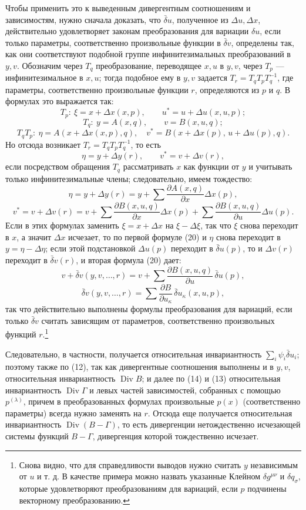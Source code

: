 \documentclass[11pt]{article}
\providecommand{\D}{\Delta}
\providecommand{\p}{\partial}
\DeclareMathOperator{\Div}{Div}
\providecommand{\bd}{\bar{\delta}}
\begin{document}
Чтобы применить это к выведенным дивергентным соотношениям и зависимостям, нужно сначала доказать, что \(\bd u\), полученное из \(\D u,\D x\), действительно удовлетворяет законам преобразования для вариации \(\delta u\), если только параметры, соответственно произвольные функции в \(\bd v\), определены так, как они соответствуют подобной группе инфинитезимальных преобразований в \(y,v\). Обозначим через \(T_q\) преобразование, переводящее \(x,u\) в \(y,v\), через \(T_p\) --- инфинитезимальное в \(x,u\); тогда подобное ему в \(y,v\) задается \(T_r=T_qT_pT_q^{-1}\), где параметры, соответственно произвольные функции \(r\), определяются из \(p\) и \(q\). В формулах это выражается так:
\[
T_p:\ \xi=x+\D x(x,p),\qquad u^*=u+\D u(x,u,p);
\]
\[
T_q:\ y=A(x,q),\qquad v=B(x,u,q);
\]
\[
T_qT_p:\ \eta=A(x+\D x(x,p),q),\quad
v^*=B(x+\D x(p),\,u+\D u(p),q).
\]
Но отсюда возникает \(T_r=T_qT_pT_q^{-1}\), то есть
\[
\eta=y+\D y(r),\qquad v^*=v+\D v(r),
\]
если посредством обращения \(T_q\) рассматривать \(x\) как функции от \(y\) и учитывать только инфинитезимальные члены; следовательно, имеем тождество:
\begin{equation}
\eta=y+\D y(r)=y+\sum\frac{\p A(x,q)}{\p x}\D x(p),
\tag{20a}
\end{equation}
\begin{equation}
v^*=v+\D v(r)=v+\sum\frac{\p B(x,u,q)}{\p x}\D x(p)
+\sum\frac{\p B(x,u,q)}{\p u}\D u(p).
\tag{20b}
\end{equation}
Если в этих формулах заменить \(\xi=x+\D x\) на \(\xi-\D \xi\), так что \(\xi\) снова переходит в \(x\), а значит \(\D x\) исчезает, то по первой формуле (20) и \(\eta\) снова переходит в \(y=\eta-\D\eta\); если этой подстановкой \(\D u(p)\) переходит в \(\bd u(p)\), то и \(\D v(r)\) переходит в \(\bd v(r)\), и вторая формула (20) дает:
\[
v+\bd v(y,v,\ldots,r)=v+\sum\frac{\p B(x,u,q)}{\p u}\,\bd u(p),
\]
\[
\bd v(y,v,\ldots,r)=\sum\frac{\p B}{\p u_\kappa}\,\bd u_\kappa(x,u,p),
\]
так что действительно выполнены формулы преобразования для вариаций, если только \(\bd v\) считать зависящим от параметров, соответственно произвольных функций \(r\).\footnote{Снова видно, что для справедливости выводов нужно считать \(y\) независимым от \(u\) и т. д. В качестве примера можно назвать указанные Клейном \(\delta g^{\mu\nu}\) и \(\delta q_\sigma\), которые удовлетворяют преобразованиям для вариаций, если \(p\) подчинены векторному преобразованию.}

Следовательно, в частности, получается относительная инвариантность \(\sum_i\psi_i\bd u_i\); поэтому также по (12), так как дивергентные соотношения выполнены и в \(y,v\), относительная инвариантность \(\Div B\); и далее по (14) и (13) относительная инвариантность \(\Div\Gamma\) и левых частей зависимостей, собранных с помощью \(p^{(\lambda)}\), причем в преобразованных формулах произвольные \(p(x)\) (соответственно параметры) всегда нужно заменять на \(r\). Отсюда еще получается относительная инвариантность \(\Div(B-\Gamma)\), то есть дивергенции нетождественно исчезающей системы функций \(B-\Gamma\), дивергенция которой тождественно исчезает.
\end{document}
